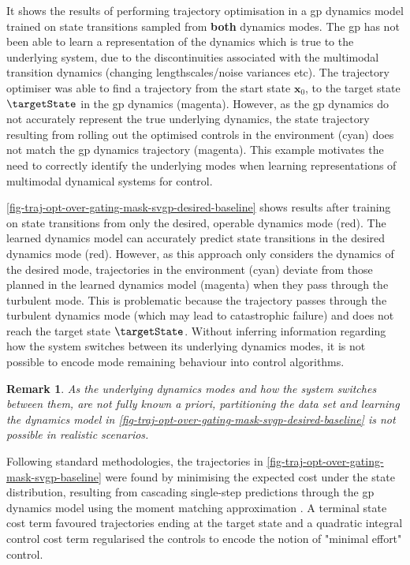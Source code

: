 \documentclass{mimosis-class/mimosis}
\newtheorem*{remark}{Remark}
\numberwithin{equation}{chapter}
\newcommand{\state}{\ensuremath{\mathbf{x}}}
\begin{document}
It shows the results of performing trajectory optimisation in a \acrshort{gp} dynamics model trained on state
transitions sampled from \textbf{both} dynamics modes.
The \acrshort{gp} has not been able to learn a representation of the dynamics which is true to the underlying system,
due to the discontinuities associated with the multimodal transition dynamics (changing lengthscales/noise variances etc).
The trajectory optimiser was able to find a trajectory from the start state \(\state_0\),
to the target state \(\targetState\) in the \acrshort{gp} dynamics (magenta).
However, as the \acrshort{gp} dynamics do not accurately represent the true underlying dynamics,
the state trajectory resulting from rolling out the optimised controls in the environment (cyan) does not match
the \acrshort{gp} dynamics trajectory (magenta).
This example motivates the need to correctly identify the underlying modes when learning representations of
multimodal dynamical systems for control.

\cref{fig-traj-opt-over-gating-mask-svgp-desired-baseline} shows results after training on state transitions from
only the desired, operable dynamics mode (red).
The learned dynamics model can accurately predict state transitions in the desired dynamics mode (red).
However, as this approach only considers the dynamics of the desired mode,
trajectories in the environment (cyan) deviate from those planned in the
learned dynamics model (magenta) when they pass through the turbulent mode.
This is problematic because the trajectory passes through the turbulent dynamics mode
(which may lead to catastrophic failure) and does not reach the target state \(\targetState\).
Without inferring information regarding how the system switches between its underlying dynamics modes, it is not
possible to encode mode remaining behaviour into control algorithms.
\begin{remark}
As the underlying dynamics modes and how the system switches between them,
are \textit{not fully known a priori}, partitioning the data set and learning the dynamics model in
\cref{fig-traj-opt-over-gating-mask-svgp-desired-baseline} is not possible in realistic scenarios.
\end{remark}


\begin{myquote}
Following standard methodologies, the trajectories in \cref{fig-traj-opt-over-gating-mask-svgp-baseline}
were found by minimising the expected cost
under the state distribution, resulting from cascading single-step predictions through the \acrshort{gp} dynamics model
using the moment matching approximation \citep{kussGaussian2006}.
A terminal state cost term favoured trajectories ending at the target state and
a quadratic integral control cost term regularised the controls to encode the notion of
"minimal effort" control.
\end{myquote}
\end{document}
